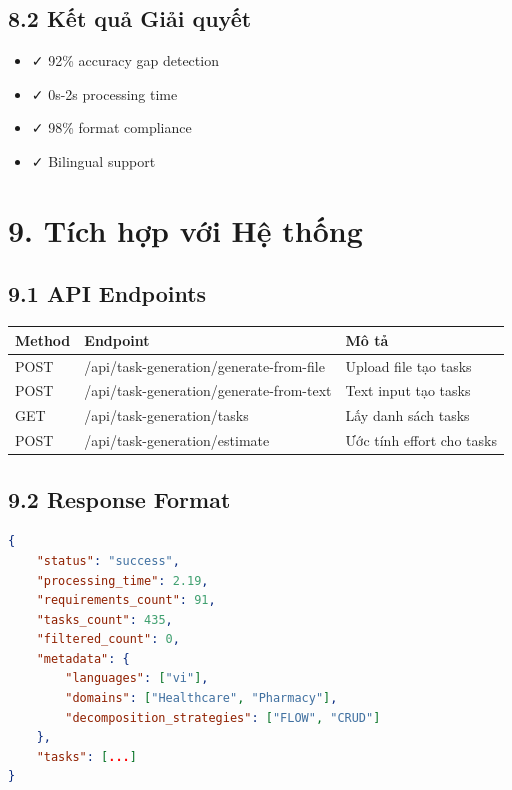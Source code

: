 \documentclass[12pt,a4paper]{article}
\begin{document}
\subsection{8.2 Kết quả Giải quyết}
\begin{itemize}
    \item ✓ 92\% accuracy gap detection
    \item ✓ 0s-2s processing time
    \item ✓ 98\% format compliance
    \item ✓ Bilingual support
\end{itemize}

\section{9. Tích hợp với Hệ thống}

\subsection{9.1 API Endpoints}

\begin{table}[h]
\centering
\begin{tabular}{|l|l|p{4cm}|}
\hline
\textbf{Method} & \textbf{Endpoint} & \textbf{Mô tả} \\
\hline
POST & /api/task-generation/generate-from-file & Upload file tạo tasks \\
\hline
POST & /api/task-generation/generate-from-text & Text input tạo tasks \\
\hline
GET & /api/task-generation/tasks & Lấy danh sách tasks \\
\hline
POST & /api/task-generation/estimate & Ước tính effort cho tasks \\
\hline
\end{tabular}
\end{table}

\subsection{9.2 Response Format}
\begin{lstlisting}[language=JSON]
{
    "status": "success",
    "processing_time": 2.19,
    "requirements_count": 91,
    "tasks_count": 435,
    "filtered_count": 0,
    "metadata": {
        "languages": ["vi"],
        "domains": ["Healthcare", "Pharmacy"],
        "decomposition_strategies": ["FLOW", "CRUD"]
    },
    "tasks": [...]
}
\end{lstlisting}
\end{document}
